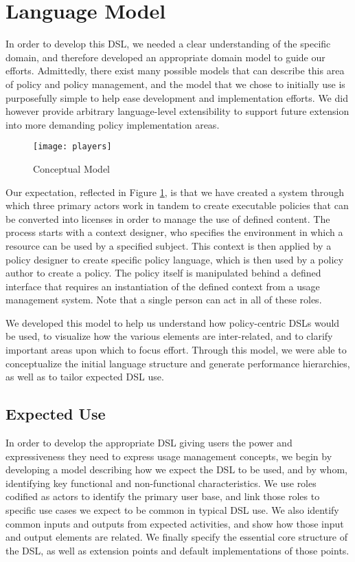 \section{Language Model}\label{sec:model}
In order to develop this DSL, we needed a clear understanding of the specific domain, and therefore developed an appropriate domain model to guide our efforts.  Admittedly, there exist many possible models that can describe this area of policy and policy management, and the model that we chose to initially use is purposefully simple to help ease development and implementation efforts.  We did however provide arbitrary language-level extensibility to support future extension into more demanding policy implementation areas.

\begin{figure}[!t]
\centering
\texttt{[image: players]}
\caption{Conceptual Model}
\label{fig:model:conceptual-model}
\end{figure}

Our expectation, reflected in Figure \ref{fig:model:conceptual-model}, is that we have created a system through which three primary actors work in tandem to create executable policies that can be converted into licenses in order to manage the use of defined content.  The process starts with a context designer, who specifies the environment in which a resource can be used by a specified subject.  This context is then applied by a policy designer to create specific policy language, which is then used by a policy author to create a policy.  The policy itself is manipulated behind a defined interface that requires an instantiation of the defined context from a usage management system.  Note that a single person can act in all of these roles.

We developed this model to help us understand how policy-centric DSLs would be used, to visualize how the various elements are inter-related, and to clarify important areas upon which to focus effort.  Through this model, we were able to conceptualize the initial language structure and generate performance hierarchies, as well as to tailor expected DSL use.

\subsection{Expected Use}
In order to develop the appropriate DSL giving users the power and expressiveness they need to express usage management concepts, we begin by developing a model describing how we expect the DSL to be used, and by whom, identifying key functional and non-functional characteristics.  We use roles codified as actors to identify the primary user base, and link those roles to specific use cases we expect to be common in typical DSL use.  We also identify common inputs and outputs from expected activities, and show how those input and output elements are related.  We finally specify the essential core structure of the DSL, as well as extension points and default implementations of those points.

